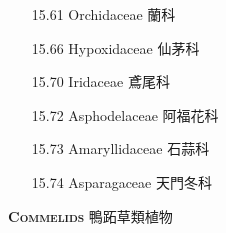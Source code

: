 \begin{enumerate}
\begin{enumerate}
      \item[15.61] Orchidaceae 蘭科     
        
      \item[15.66] Hypoxidaceae 仙茅科     
        
      \item[15.70] Iridaceae 鳶尾科     
        
      \item[15.72] Asphodelaceae 阿福花科     
        
      \item[15.73] Amaryllidaceae 石蒜科     
        
      \item[15.74] Asparagaceae 天門冬科     
        
    \end{enumerate}
\end{enumerate}
\vspace{2ex} 
\noindent \normalsize\textsc{\textbf{Commelids} 鴨跖草類植物}\selectfont \\
\footnotesize\selectfont
